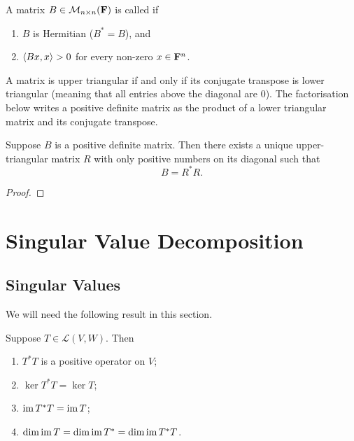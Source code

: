 \begin{definition}
A matrix $B\in\mathcal{M}_{n\times n}(\mathbf F)$ is called  if
\begin{enumerate}[label=(\roman*)]
\item $B$ is Hermitian ($B^*=B$), and
\item $\left\langle Bx,x\right\rangle>0$ for every non-zero $x\in\mathbf F^n$.
\end{enumerate} 
\end{definition}

A matrix is upper triangular if and only if its conjugate transpose is lower triangular (meaning that all entries above the diagonal are $0$). 
The factorisation below writes a positive definite matrix as the product of a lower triangular matrix and its conjugate transpose.

\begin{theorem}
Suppose $B$ is a positive definite matrix. Then there exists a unique upper-triangular matrix $R$ with only positive numbers on its diagonal such that
\begin{equation}
B=R^*R.
\end{equation}
\end{theorem}

\begin{proof}

\end{proof}
\pagebreak

\section{Singular Value Decomposition}
\subsection{Singular Values}
We will need the following result in this section.

\begin{lemma}[Properties of $T^*T$]
Suppose $T\in\mathcal{L}(V,W)$. Then
\begin{enumerate}[label=(\roman*)]
\item $T^*T$ is a positive operator on $V$;
\item $\ker T^*T=\ker T$;
\item $\operatorname{im} T^*T=\operatorname{im} T$;
\item $\dim\operatorname{im} T=\dim\operatorname{im} T^*=\dim\operatorname{im} T^*T$.
\end{enumerate}
\end{lemma}

